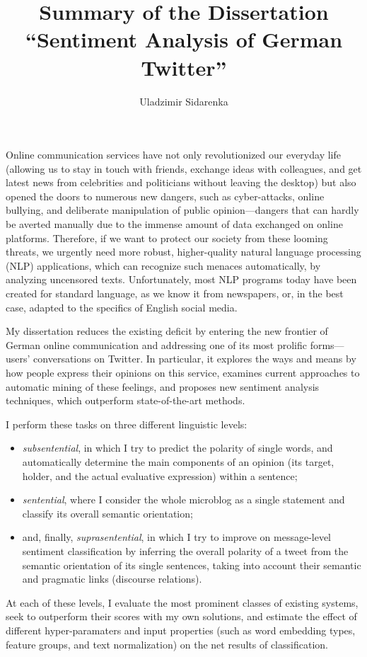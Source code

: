 \documentclass[11pt]{article}
\author{Uladzimir Sidarenka}
\title{  {\large Summary of the Dissertation}\\[0.5em]
  {\Large ``Sentiment Analysis of German Twitter''}}
\date{\vspace{-3ex}}
\begin{document}
\maketitle

Online communication services have not only revolutionized our
everyday life (allowing us to stay in touch with friends, exchange
ideas with colleagues, and get latest news from celebrities and
politicians without leaving the desktop) but also opened the doors to
numerous new dangers, such as cyber-attacks, online bullying, and
deliberate manipulation of public opinion---dangers that can hardly be
averted manually due to the immense amount of data exchanged on online
platforms.  Therefore, if we want to protect our society from these
looming threats, we urgently need more robust, higher-quality natural
language processing (NLP) applications, which can recognize such
menaces automatically, by analyzing uncensored texts.  Unfortunately,
most NLP programs today have been created for standard language, as we
know it from newspapers, or, in the best case, adapted to the
specifics of English social media.

My dissertation reduces the existing deficit by entering the new
frontier of German online communication and addressing one of its most
prolific forms---users' conversations on Twitter.  In particular, it
explores the ways and means by how people express their opinions on
this service, examines current approaches to automatic mining of these
feelings, and proposes new sentiment analysis techniques, which
outperform state-of-the-art methods.

I perform these tasks on three different linguistic levels:
\begin{itemize}
  \item\emph{subsentential}, in which I try to predict the polarity of
    single words, and automatically determine the main components of
    an opinion (its target, holder, and the actual evaluative
    expression) within a sentence;

  \item\emph{sentential}, where I consider the whole microblog as a
    single statement and classify its overall semantic orientation;

  \item and, finally, \emph{suprasentential}, in which I try to
    improve on message-level sentiment classification by inferring the
    overall polarity of a tweet from the semantic orientation of its
    single sentences, taking into account their semantic and pragmatic
    links (discourse relations).
\end{itemize}
At each of these levels, I evaluate the most prominent classes of
existing systems, seek to outperform their scores with my own
solutions, and estimate the effect of different hyper-paramaters and
input properties (such as word embedding types, feature groups, and
text normalization) on the net results of classification.
\end{document}
